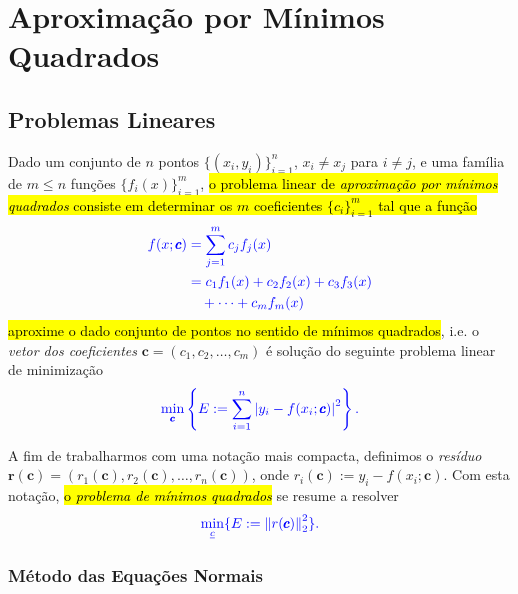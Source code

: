 
\chapter{Aproximação por Mínimos Quadrados}\label{cap_ajuste}
\thispagestyle{fancy}

\section{Problemas Lineares}\label{cap_ajuste_sec_prob_lin}

Dado um conjunto de $n$ pontos $\{(x_i,y_i)\}_{i=1}^n$, $x_i\neq x_j$ para $i\neq j$, e uma família de $m \leq n$ funções $\{f_i(x)\}_{i=1}^m$, \hl{o problema linear de \emph{aproximação por mínimos quadrados} consiste em determinar os $m$ coeficientes $\{c_i\}_{i=1}^m$ tal que a função}
\begin{subequations}\hleq
  \begin{align}    
    f(x; \pmb{c}) &= \sum_{j=1}^m c_jf_j(x) \\
    &= c_1f_1(x) + c_2f_2(x) + c_3f_3(x) \nonumber\\
    &\quad + \cdots + c_mf_m(x)
  \end{align}
\end{subequations}
\hl{aproxime o dado conjunto de pontos no sentido de mínimos quadrados}, i.e. o \emph{vetor dos coeficientes} $\pmb{c} = (c_1, c_2, \dotsc, c_m)$ é solução do seguinte problema linear de minimização
\begin{equation}\color{blue}\min_{\pmb{c}} \left\{E:= \sum_{i=1}^n \left|y_i - f(x_i; \pmb{c})\right|^2\right\}.
\end{equation}

A fim de trabalharmos com uma notação mais compacta, definimos o \emph{resíduo} $\pmb{r}(\pmb{c}) = (r_1(\pmb{c}), r_2(\pmb{c}), \dotsc, r_n(\pmb{c}))$, onde $r_i(\pmb{c}) := y_i - f(x_i; \pmb{c})$. Com esta notação, \hl{o \emph{problema de mínimos quadrados}} se resume a resolver
\begin{equation}\label{cap_ajuste_sec_prob_lin:eq:pmq}\color{blue}\min_{\emph{c}} \{E := \left\|r(\pmb{c})\right\|_2^2\}.
\end{equation}

\subsection{Método das Equações Normais}

